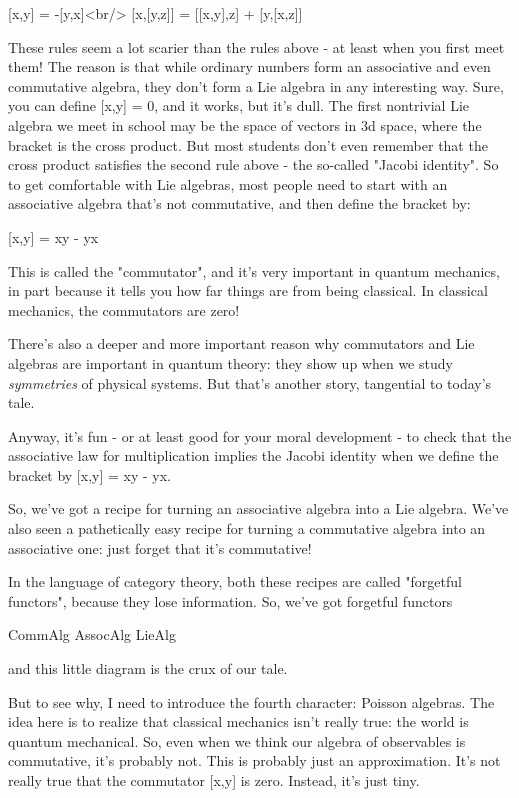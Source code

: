 [x,y] = -[y,x]<br/>
[x,[y,z]] = [[x,y],z] + [y,[x,z]]

These rules seem a lot scarier than the rules above - at least when
you first meet them!  The reason is that while ordinary numbers form
an associative and even commutative algebra, they don't form a Lie
algebra in any interesting way.  Sure, you can define [x,y] = 0, and
it works, but it's dull.  The first nontrivial Lie algebra we meet in
school may be the space of vectors in 3d space, where the bracket is
the cross product.  But most students don't even remember that the
cross product satisfies the second rule above - the so-called
"Jacobi identity".  So to get comfortable with Lie algebras,
most people need to start with an associative algebra that's not
commutative, and then define the bracket by:

[x,y] = xy - yx

This is called the "commutator", and it's very important in
quantum mechanics, in part because it tells you how far things are
from being classical.  In classical mechanics, the commutators are
zero!

There's also a deeper and more important reason why commutators and
Lie algebras are important in quantum theory: they show up when we
study \emph{symmetries} of physical systems.  But that's another story,
tangential to today's tale.

Anyway, it's fun - or at least good for your moral development - to
check that the associative law for multiplication implies the Jacobi
identity when we define the bracket by [x,y] = xy - yx.

So, we've got a recipe for turning an associative algebra into a Lie
algebra.  We've also seen a pathetically easy recipe for turning a
commutative algebra into an associative one: just forget that it's
commutative!  

In the language of category theory, both these recipes are called
"forgetful functors", because they lose information.  So,
we've got forgetful functors

CommAlg \to  AssocAlg \to  LieAlg

and this little diagram is the crux of our tale.  

But to see why, I need to introduce the fourth character: Poisson
algebras.  The idea here is to realize that classical mechanics isn't
really true: the world is quantum mechanical.  So, even when we think
our algebra of observables is commutative, it's probably not.  This is
probably just an approximation.  It's not really true that the
commutator [x,y] is zero.  Instead, it's just tiny.

